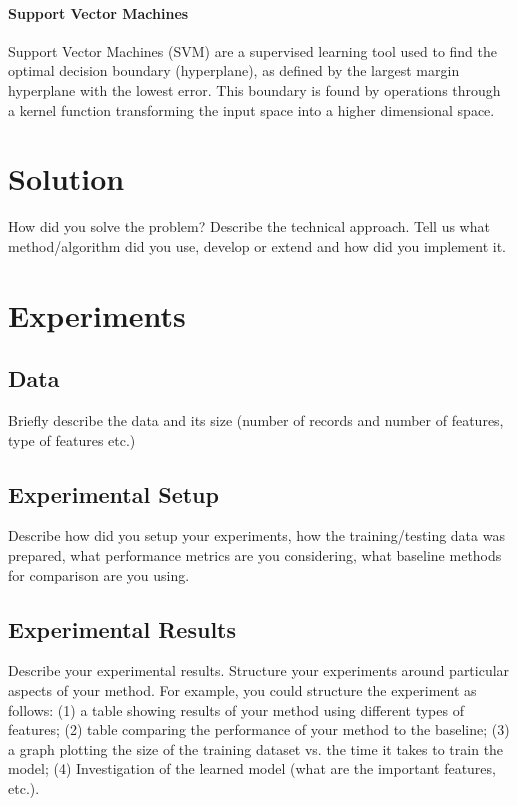 \documentclass[letterpaper,10pt]{article}
\begin{document}
\paragraph{Support Vector Machines} Support Vector Machines
(SVM)\cite{vapnik1995} are a supervised learning tool used to find the
optimal decision boundary (hyperplane), as defined by the largest margin
hyperplane with the lowest error. This boundary is found by operations
through a kernel function transforming the input space into a higher
dimensional space.


\section{Solution}

How did you solve the problem? Describe the technical approach. Tell us
what method/algorithm did you use, develop or extend and how did you
implement it.


\section{Experiments}

\subsection{Data} Briefly describe the data and its size (number of
records and number of features, type of features etc.)

\subsection{Experimental Setup} Describe how did you setup your
experiments, how the training/testing data was prepared, what performance
metrics are you considering, what baseline methods for comparison are you
using.

\subsection{Experimental Results} Describe your experimental results.
Structure your experiments around particular aspects of your method. For
example, you could structure the experiment as follows: (1) a table
showing results of your method using different types of features; (2)
table comparing the performance of your method to the baseline; (3) a
graph plotting the size of the training dataset vs. the time it takes to
train the model; (4) Investigation of the learned model (what are the
important features, etc.). \cite{santos2009}
\end{document}
